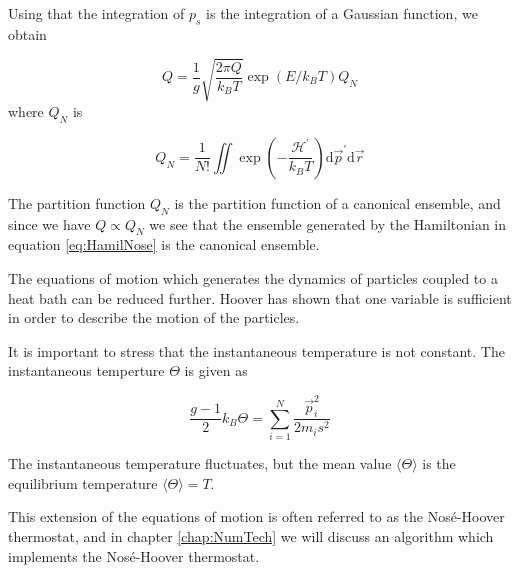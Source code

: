 Using that the integration of $p_s$ is the integration of a Gaussian
function, we obtain

\begin{equation}
  Q = \frac{1}{g} \sqrt{\frac{2\pi Q}{k_B T}} \exp(E/k_B T) Q_N
\end{equation}
where $Q_N$ is

\begin{equation}
  Q_N = \frac{1}{N!} \iint \exp\left(-\frac{\mathcal{H}^{\prime}}{k_B T}\right)
                      \mathrm{d}\vec{p}^{\prime} \mathrm{d}\vec{r}
\end{equation}

The partition function $Q_N$ is the partition function of a canonical
ensemble, and since we have $Q \propto Q_N$ we see that the ensemble
generated by the Hamiltonian in equation \eqref{eq:HamilNose} is the
canonical ensemble.

The equations of motion which generates the dynamics of particles
coupled to a heat bath can be reduced further. Hoover \cite{Hoover85}
has shown that one variable is sufficient in order to describe the motion
of the particles.

It is important to stress that the instantaneous temperature is not constant.
The instantaneous temperture $\Theta$ is given as

\begin{equation}
  \frac{g-1}{2} k_B \Theta = \sum_{i=1}^N \frac{\vec{p}_i^2}{2m_i s^2}
\end{equation}

The instantaneous temperature fluctuates, but the mean value $\langle
\Theta \rangle$ is the equilibrium temperature \ie $\langle \Theta
\rangle = T$. 

This extension of the equations of motion is often referred to as the
Nos\'{e}-Hoover thermostat, and in chapter \ref{chap:NumTech} we will
discuss an algorithm which implements the Nos\'{e}-Hoover thermostat.
